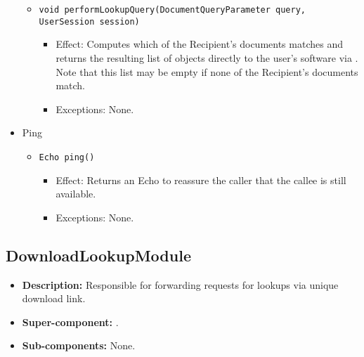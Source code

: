 \begin{itemize}
\begin{itemize}
		\item \texttt{void performLookupQuery(DocumentQueryParameter query, UserSession session)}
		\begin{itemize}
			\item Effect: Computes which of the Recipient's documents matches  and returns the resulting list of  objects directly to the user's software via . Note that this list may be empty if none of the Recipient's documents match.
			\item Exceptions: None.
		\end{itemize}
	\end{itemize}

	\item Ping
	\begin{itemize}
		\item \texttt{Echo ping()}
		\begin{itemize}
			\item Effect: Returns an Echo to reassure the caller that the callee is still available.
			\item Exceptions: None.
		\end{itemize}
	\end{itemize}
\end{itemize}

\subsection{DownloadLookupModule}
\begin{itemize}
    \item \textbf{Description:} Responsible for forwarding requests for lookups via unique download link.
    \item \textbf{Super-component:} .
    \item \textbf{Sub-components:} None.
\end{itemize}

